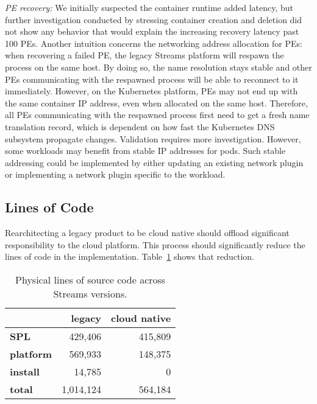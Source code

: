 \emph{PE recovery:} We initially suspected the container runtime added latency,
but further investigation conducted by stressing container creation and
deletion did not show any behavior that would explain the increasing recovery
latency past 100 PEs. Another intuition concerns the networking address
allocation for PEs: when recovering a failed PE, the legacy Streams platform
will respawn the process on the same host. By doing so, the name resolution
stays stable and other PEs communicating with the respawned process will be
able to reconnect to it immediately. However, on the Kubernetes platform, PEs
may not end up with the same container IP address, even when allocated on the
same host. Therefore, all PEs communicating with the respawned process first
need to get a fresh name translation record, which is dependent on how fast the
Kubernetes DNS subsystem propagate changes.  Validation requires more
investigation. However, some workloads may benefit from stable IP addresses
for pods. Such stable addressing could be implemented by either updating an
existing network plugin or implementing a network plugin specific to the
workload.

\subsection{Lines of Code}

Rearchitecting a legacy product to be cloud native should offload significant
responsibility to the cloud platform. This process should significantly
reduce the lines of code in the implementation. Table~\ref{tab:sloc} shows
that reduction.

\begin{table}[h]
    \centering
    \footnotesize
    \begin{tabular}{|l|r|r|}
        \hline
                             & \textbf{legacy}   & \textbf{cloud native}  \\
        \hline
        \textbf{SPL}         &           429,406 &                415,809 \\
        \textbf{platform}    &           569,933 &                148,375 \\
        \textbf{install}     &            14,785 &                      0 \\
        \hline
        \hline
        \textbf{total}       &         1,014,124 &                564,184 \\
        \hline
    \end{tabular}
    \caption{Physical lines of source code across Streams versions.}
    \label{tab:sloc}
\end{table}

